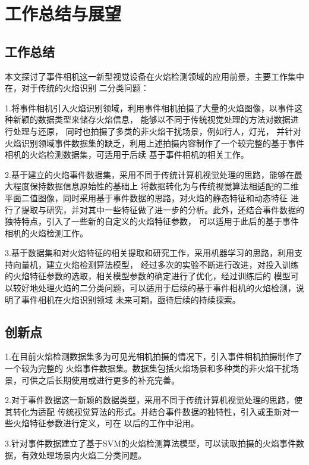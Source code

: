 
\chapter{工作总结与展望}

\section{工作总结}
 本文探讨了事件相机这一新型视觉设备在火焰检测领域的应用前景，主要工作集中在，对于传统的火焰识别
 二分类问题：

 1.将事件相机引入火焰识别领域，利用事件相机拍摄了大量的火焰图像，以事件这种新颖的数据类型来储存火焰信息，
 能够以不同于传统视觉处理的方法对数据进行处理与还原， 同时也拍摄了多类的非火焰干扰场景，例如行人，灯光，
 并针对火焰识别领域事件数据集的缺乏，利用上述拍摄内容制作了一个较完整的基于事件相机的火焰检测数据集，可适用于后续
 基于事件相机的相关工作。
 
 2.基于建立的火焰事件数据集，采用不同于传统计算机视觉处理的思路，能够在最大程度保持数据信息原始性的基础上
 将数据转化为与传统视觉算法相适配的二维平面二值图像，同时采用基于事件数据的思路，对火焰的静态特征和动态特征
 进行了提取与研究，并对其中一些特征做了进一步的分析。此外，还结合事件数据的独特特点，引入了一些新的自定义的火焰特征参数，
 可以适用于此后的基于事件相机的火焰检测工作。

 3.基于数据集和对火焰特征的相关提取和研究工作，采用机器学习的思路，利用支持向量机，建立火焰检测算法模型，
 经过多次的实验不断进行改进，对投入训练的火焰特征参数的选取，相关模型参数的确定进行了优化，经过训练后的
 模型可以较好地处理火焰的二分类问题，可以适用于后续的基于事件相机的火焰检测，说明了事件相机在火焰识别领域
 未来可期，亟待后续的持续探索。

\section{创新点}
 1.在目前火焰检测数据集多为可见光相机拍摄的情况下，引入事件相机拍摄制作了一个较为完整的
 火焰事件数据集。数据集包括火焰场景和多种类的非火焰干扰场景，可供之后长期使用或进行更多的补充完善。

 2.对于事件数据这一新颖的数据类型，采用不同于传统计算机视觉处理的思路，使其转化为适配
 传统视觉算法的形式。并结合事件数据的独特性，引入或重新对一些火焰特征参数进行定义，可在
 以后的工作中沿用。

 3.针对事件数据建立了基于SVM的火焰检测算法模型，可以读取拍摄的火焰事件数据，有效处理场景内火焰二分类问题。

